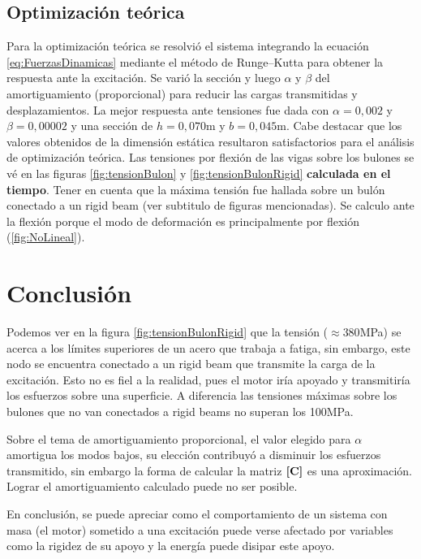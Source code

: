 \documentclass[onecolumn,10pt,titlepage,a4paper]{article}
\begin{document}
\subsection*{Optimización teórica}
Para la optimización teórica se resolvió el sistema integrando la ecuación \ref{eq:FuerzasDinamicas} mediante el método de Runge--Kutta para obtener la respuesta ante la excitación. Se varió la sección y luego $\alpha$ y $\beta$ del amortiguamiento (proporcional) \cite{cook2007concepts} para reducir las cargas transmitidas y desplazamientos. La mejor respuesta ante tensiones fue dada con $\alpha=0,002$ y $\beta = 0,00002$ y una sección de $h=0,070$m y $b=0,045$m. Cabe destacar que los valores obtenidos de la dimensión estática resultaron satisfactorios para el análisis de optimización teórica. Las tensiones por flexión de las vigas sobre los bulones se vé en las figuras \ref{fig:tensionBulon} y \ref{fig:tensionBulonRigid} \textbf{calculada en el tiempo}. Tener en cuenta que la máxima tensión fue hallada sobre un bulón conectado a un rigid beam (ver subtitulo de figuras mencionadas). Se calculo ante la flexión porque el modo de deformación es principalmente por flexión (\ref{fig:NoLineal}).

\section{Conclusión}
Podemos ver en la figura \ref{fig:tensionBulonRigid} que la tensión ($\approx 380$MPa) se acerca a los límites superiores de un acero que trabaja a fatiga, sin embargo, este nodo se encuentra conectado a un rigid beam que transmite la carga de la excitación. Esto no es fiel a la realidad, pues el motor iría apoyado y transmitiría los esfuerzos sobre una superficie. A diferencia las tensiones máximas sobre los bulones que no van conectados a rigid beams no superan los 100MPa. 

Sobre el tema de amortiguamiento proporcional, el valor elegido para $\alpha$ amortigua los modos bajos, su elección contribuyó a disminuir los esfuerzos transmitido, sin embargo la forma de calcular la matriz $\boldsymbol{[}\mathbf{C} \boldsymbol{]}$ es una aproximación. Lograr el amortiguamiento calculado puede no ser posible.

En conclusión, se puede apreciar como el comportamiento de un sistema con masa (el motor) sometido a una excitación  puede verse afectado por variables como la rigidez de su apoyo y la energía puede disipar este apoyo.
\end{document}
